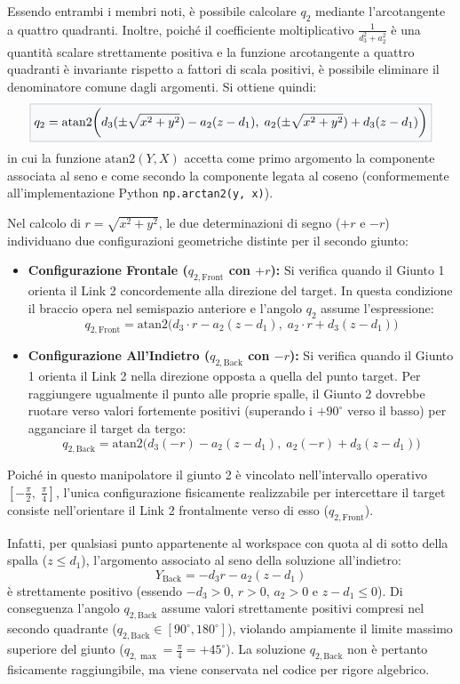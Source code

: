 \documentclass[11pt, a4paper]{report}
\begin{document}
Essendo entrambi i membri noti, è possibile calcolare $q_{2}$ mediante l'arcotangente a quattro quadranti. Inoltre, poiché il coefficiente moltiplicativo $\frac{1}{d_{3}^{2} + a_{2}^{2}}$ è una quantità scalare strettamente positiva e la funzione arcotangente a quattro quadranti è invariante rispetto a fattori di scala positivi, è possibile eliminare il denominatore comune dagli argomenti. Si ottiene quindi:
\[
    \fcolorbox{primaryNavy!40}{softBg}{$\displaystyle
        q_2 = \text{atan2}\biggl(d_{3} (\pm \sqrt{x^2+y^2}) - a_{2} (z - d_1), \; a_{2} (\pm \sqrt{x^2+y^2}) + d_{3} (z - d_1)\biggr)
    $}
\]
in cui la funzione $\text{atan2}(Y, X)$ accetta come primo argomento la componente associata al seno e come secondo la componente legata al coseno (conformemente all'implementazione Python \texttt{np.arctan2(y, x)}).

Nel calcolo di $r = \sqrt{x^2 + y^2}$, le due determinazioni di segno ($+r$ e $-r$) individuano due configurazioni geometriche distinte per il secondo giunto:
\begin{itemize}
    \item \textbf{Configurazione Frontale ($q_{2,\text{Front}}$ con $+r$):} Si verifica quando il Giunto 1 orienta il Link 2 concordemente alla direzione del target. In questa condizione il braccio opera nel semispazio anteriore e l'angolo $q_2$ assume l'espressione:
    \[
        q_{2,\text{Front}} = \text{atan2}\biggl(d_{3} \cdot r - a_{2} (z - d_1), \; a_{2} \cdot r + d_{3} (z - d_1)\biggr)
    \]
    \item \textbf{Configurazione All'Indietro ($q_{2,\text{Back}}$ con $-r$):} Si verifica quando il Giunto 1 orienta il Link 2 nella direzione opposta a quella del punto target. Per raggiungere ugualmente il punto alle proprie spalle, il Giunto 2 dovrebbe ruotare verso valori fortemente positivi (superando i $+90^\circ$ verso il basso) per agganciare il target da tergo:
    \[
        q_{2,\text{Back}} = \text{atan2}\biggl(d_{3} (-r) - a_{2} (z - d_1), \; a_{2} (-r) + d_{3} (z - d_1)\biggr)
    \]
\end{itemize}
Poiché in questo manipolatore il giunto 2 è vincolato nell'intervallo operativo $[-\frac{\pi}{2}, \; \frac{\pi}{4}]$, l'unica configurazione fisicamente realizzabile per intercettare il target consiste nell'orientare il Link 2 frontalmente verso di esso ($q_{2,\text{Front}}$).

Infatti, per qualsiasi punto appartenente al workspace con quota al di sotto della spalla ($z \le d_1$), l'argomento associato al seno della soluzione all'indietro:
\[
Y_{\text{Back}} = -d_3 r - a_2(z - d_1)
\]
è strettamente positivo (essendo $-d_3 > 0$, $r > 0$, $a_2 > 0$ e $z - d_1 \le 0$). Di conseguenza l'angolo $q_{2,\text{Back}}$ assume valori strettamente positivi compresi nel secondo quadrante ($q_{2,\text{Back}} \in [90^\circ, 180^\circ]$), violando ampiamente il limite massimo superiore del giunto ($q_{2,\max} = \frac{\pi}{4} = +45^\circ$). La soluzione $q_{2,\text{Back}}$ non è pertanto fisicamente raggiungibile, ma viene conservata nel codice per rigore algebrico.
\end{document}
